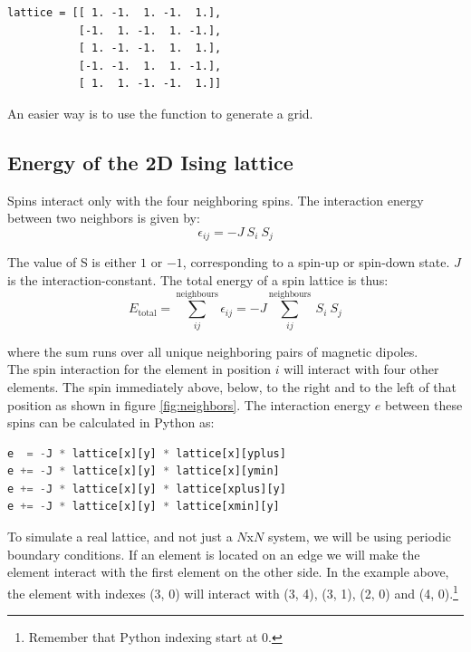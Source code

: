 \documentclass{article}
\begin{document}
\begin{lstlisting}
lattice = [[ 1. -1.  1. -1.  1.],
           [-1.  1. -1.  1. -1.],
           [ 1. -1. -1.  1.  1.],
           [-1. -1.  1.  1. -1.],
           [ 1.  1. -1. -1.  1.]]
\end{lstlisting}

An easier way is to use the  function to generate a grid.

\subsection{Energy of the 2D Ising lattice} \label{section:energy}

Spins interact only with the four neighboring spins. The interaction energy between two neighbors is given by:
\begin{equation}
\epsilon_{ij} = -J \ S_i \ S_j
\end{equation} 

The value of S is either $1$ or $-1$, corresponding to a spin-up or spin-down state. $J$ is the interaction-constant.
The total energy of a spin lattice is thus:
\begin{equation}
E_{\mathrm{total}}=\sum^{\mathrm{neighbours}}_{ij} \epsilon_{ij} = -J \sum^{\mathrm{neighbours}}_{ij} \ S_i \ S_j
\end{equation}

where the sum runs over all unique neighboring pairs of magnetic dipoles.\\

The spin interaction for the element in position $i$ will interact with four other elements.
The spin immediately above, below, to the right and to the left of that position as shown in figure \ref{fig:neighbors}.
The interaction energy $e$ between these spins can be calculated in Python as:

\begin{lstlisting}[language=python]
e  = -J * lattice[x][y] * lattice[x][yplus]
e += -J * lattice[x][y] * lattice[x][ymin]
e += -J * lattice[x][y] * lattice[xplus][y]
e += -J * lattice[x][y] * lattice[xmin][y]
\end{lstlisting}

To simulate a real lattice, and not just a $N$x$N$ system, we will be using
periodic boundary conditions.
If an element is located on an edge we will make the element interact with the first element on the other side.
In the example above, the element with indexes (3, 0) will interact with (3, 4), (3, 1), (2, 0) and (4, 0).\footnote{Remember that Python indexing start at 0.}\\
\end{document}
